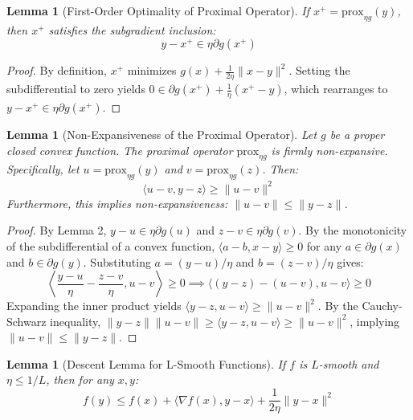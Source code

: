 \documentclass{article}
\newtheorem{lemma}[theorem]{Lemma}
\begin{document}
\begin{lemma}[First-Order Optimality of Proximal Operator]
If $x^+ = \text{prox}_{\eta g}(y)$, then $x^+$ satisfies the subgradient inclusion:
\begin{equation}
y - x^+ \in \eta \partial g(x^+)
\end{equation}
\end{lemma}
\begin{proof}
By definition, $x^+$ minimizes $g(x) + \frac{1}{2\eta}\|x-y\|^2$. Setting the subdifferential to zero yields $0 \in \partial g(x^+) + \frac{1}{\eta}(x^+ - y)$, which rearranges to $y - x^+ \in \eta \partial g(x^+)$.
\end{proof}

\begin{lemma}[Non-Expansiveness of the Proximal Operator]
Let $g$ be a proper closed convex function. The proximal operator $\text{prox}_{\eta g}$ is firmly non-expansive. Specifically, let $u = \text{prox}_{\eta g}(y)$ and $v = \text{prox}_{\eta g}(z)$. Then:
\begin{equation}
\langle u - v, y - z \rangle \geq \|u - v\|^2
\end{equation}
Furthermore, this implies non-expansiveness: $\|u - v\| \leq \|y - z\|$.
\end{lemma}
\begin{proof}
By Lemma 2, $y - u \in \eta \partial g(u)$ and $z - v \in \eta \partial g(v)$. By the monotonicity of the subdifferential of a convex function, $\langle a - b, x - y \rangle \geq 0$ for any $a \in \partial g(x)$ and $b \in \partial g(y)$. Substituting $a = (y-u)/\eta$ and $b = (z-v)/\eta$ gives:
\begin{equation}
\left\langle \frac{y-u}{\eta} - \frac{z-v}{\eta}, u - v \right\rangle \geq 0 \implies \langle (y - z) - (u - v), u - v \rangle \geq 0
\end{equation}
Expanding the inner product yields $\langle y - z, u - v \rangle \geq \|u - v\|^2$. By the Cauchy-Schwarz inequality, $\|y - z\| \|u - v\| \geq \langle y - z, u - v \rangle \geq \|u - v\|^2$, implying $\|u - v\| \leq \|y - z\|$.
\end{proof}

\begin{lemma}[Descent Lemma for L-Smooth Functions]
If $f$ is $L$-smooth and $\eta \leq 1/L$, then for any $x, y$:
\begin{equation}
f(y) \leq f(x) + \langle \nabla f(x), y - x \rangle + \frac{1}{2\eta} \|y - x\|^2
\end{equation}
\end{lemma}
\end{document}
